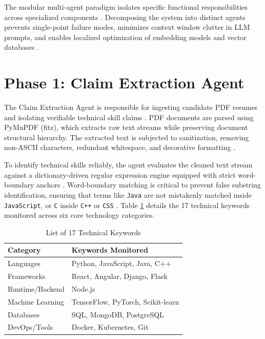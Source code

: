The modular multi-agent paradigm isolates specific functional responsibilities across specialized components \cite{ref30, ref37}. Decomposing the system into distinct agents prevents single-point failure modes, minimizes context window clutter in LLM prompts, and enables localized optimization of embedding models and vector databases \cite{ref31, ref33, ref39}.

\section{Phase 1: Claim Extraction Agent}

The Claim Extraction Agent is responsible for ingesting candidate PDF resumes and isolating verifiable technical skill claims \cite{ref40}. PDF documents are parsed using PyMuPDF (fitz), which extracts raw text streams while preserving document structural hierarchy. The extracted text is subjected to sanitization, removing non-ASCII characters, redundant whitespace, and decorative formatting \cite{ref9}.

To identify technical skills reliably, the agent evaluates the cleaned text stream against a dictionary-driven regular expression engine equipped with strict word-boundary anchors \cite{ref1, ref11}. Word-boundary matching is critical to prevent false substring identification, ensuring that terms like \texttt{Java} are not mistakenly matched inside \texttt{JavaScript}, or \texttt{C} inside \texttt{C++} or \texttt{CSS} \cite{ref49}. Table \ref{tab:keywords} details the 17 technical keywords monitored across six core technology categories.

\begin{table}[htbp]
\centering
\small
\setlength{\tabcolsep}{10pt}
\caption{List of 17 Technical Keywords}
\label{tab:keywords}
\begin{tabularx}{\textwidth}{@{}lX@{}}
\toprule
\textbf{Category} & \textbf{Keywords Monitored} \\ \midrule
Languages & Python, JavaScript, Java, C++ \\
Frameworks & React, Angular, Django, Flask \\
Runtime/Backend & Node.js \\
Machine Learning & TensorFlow, PyTorch, Scikit-learn \\
Databases & SQL, MongoDB, PostgreSQL \\
DevOps/Tools & Docker, Kubernetes, Git \\ \bottomrule
\end{tabularx}
\end{table}


